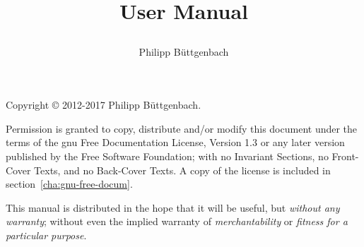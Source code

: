 \documentclass[a4paper,11pt,twoside,xetex]{refrep}
\begin{document}
\title{\parbox{\textwidth}{
    \centering
    \\[\bigskipamount] User Manual}}
\author{\foreignlanguage{ngerman}{Philipp Büttgenbach}}
\maketitle
\begin{fullpage}
  \thispagestyle{empty} \vfill Copyright \copyright{} 2012-2017
  \foreignlanguage{ngerman}{Philipp Büttgenbach}.

  Permission is granted to copy, distribute and/or modify this
  document under the terms of the \gls{gnu} Free Documentation
  License, Version 1.3 or any later version published by the Free
  Software Foundation; with no Invariant Sections, no Front-Cover
  Texts, and no Back-Cover Texts.  A copy of the license is included
  in section~\ref{cha:gnu-free-docum}.

  This manual is distributed in the hope that it will be useful, but
  \emph{without any warranty}; without even the implied warranty of
  \emph{merchantability} or \emph{fitness for a particular purpose}.
\end{fullpage}
\tableofcontents
\listoffigures
\printglossary[title={Index of Notations}]
\printacronyms









\begin{appendix}
  
\end{appendix}

\printbibliography
\end{document}

